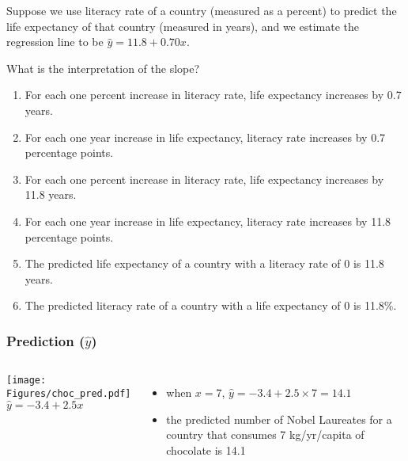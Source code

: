 \begin{frame}
Suppose we use literacy rate of a country (measured as a percent) to predict the life expectancy of that country (measured in years), and we estimate the regression line to be $\hat{y}=11.8+0.70x$.
\begin{clicker}{What is the interpretation of the slope?}
\begin{enumerate}
    \item
    For each one percent increase in literacy rate, life expectancy increases by 0.7 years.
    \item
    For each one year increase in life expectancy, literacy rate increases by 0.7 percentage points.
    \item
    For each one percent increase in literacy rate, life expectancy increases by 11.8 years.
    \item
    For each one year increase in life expectancy, literacy rate increases by 11.8 percentage points.
    \item
    The predicted life expectancy of a country with a literacy rate of 0 is 11.8 years.
    \item
    The predicted literacy rate of a country with a life expectancy of 0 is 11.8\%.
\end{enumerate}
\end{clicker}
\end{frame}

\begin{frame}
\frametitle{Prediction ($\hat{y}$)}
\begin{columns}
\texttt{[image: Figures/choc\_pred.pdf]}\\
$\displaystyle \hat{y}= -3.4 + 2.5x$
\begin{itemize}
    \item
    when $x=7$, $\hat{y}= -3.4 + 2.5\times7=14.1$
    \item
    the predicted number of Nobel Laureates for a country that consumes 7 kg/yr/capita of chocolate is 14.1
\end{itemize}
\end{columns}
\end{frame}

